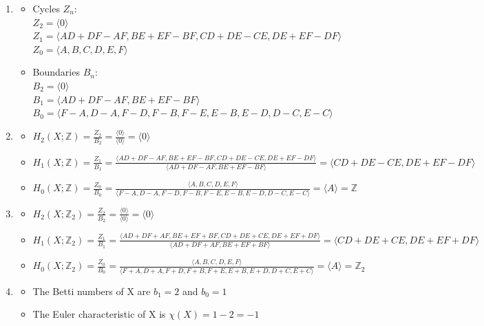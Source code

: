 \documentclass{article}
\begin{document}
\begin{enumerate}[label*=\alph*)]
    \item 
        \begin{itemize}
            \item Cycles $Z_n$: \\
                $Z_2 = \langle 0 \rangle$\\
                $Z_1 = \langle AD + DF - AF, BE + EF - BF, CD + DE - CE, DE + EF - DF \rangle$\\
                $Z_0 = \langle A, B, C, D, E, F \rangle$
            \item Boundaries $B_n$: \\
                $B_2 = \langle 0 \rangle$\\
                $B_1 = \langle AD + DF - AF, BE + EF - BF \rangle$\\
                $B_0 = \langle F - A, D - A, F - D, F - B, F - E, E - B, E - D, D - C, E - C \rangle$
        \end{itemize}
    \item
        \begin{itemize}
            \item $H_2(X;\mathbb{Z})= \frac{Z_2}{B_2} = \frac{\langle 0 \rangle}{\langle 0 \rangle} = \langle 0 \rangle$
            \item $H_1(X;\mathbb{Z}) = \frac{Z_1}{B_1} = 
                \frac{\langle AD + DF - AF, BE + EF - BF, CD + DE - CE, DE + EF - DF \rangle}
                        {\langle AD + DF - AF, BE + EF - BF \rangle} =
                    \langle CD + DE - CE, DE + EF - DF \rangle$
            \item $H_0(X;\mathbb{Z}) = \frac{Z_0}{B_0} = \frac{\langle A, B, C, D, E, F \rangle}{\langle F - A, D - A, F - D, F - B, F - E, E - B, E - D, D - C, E - C \rangle} = \langle A \rangle = \mathbb{Z}$
        \end{itemize}
    \item 
        \begin{itemize}
            \item $H_2(X;\mathbb{Z}_2)= \frac{Z_2}{B_2} = \frac{\langle 0 \rangle}{\langle 0 \rangle} = \langle 0 \rangle$
            \item $H_1(X;\mathbb{Z}_2) = \frac{Z_1}{B_1} = 
                \frac{\langle AD + DF + AF, BE + EF + BF, CD + DE + CE, DE + EF + DF \rangle}
                        {\langle AD + DF + AF, BE + EF + BF \rangle} =
                    \langle CD + DE + CE, DE + EF + DF \rangle$
            \item $H_0(X;\mathbb{Z}_2) = \frac{Z_0}{B_0} = \frac{\langle A, B, C, D, E, F \rangle}{\langle F + A, D + A, F + D, F + B, F + E, E + B, E + D, D + C, E + C \rangle} = \langle A \rangle = \mathbb{Z}_2$
        \end{itemize}
    \item
        \begin{itemize}
            \item The Betti numbers of X are $b_1 = 2$ and $b_0 = 1$
            \item The Euler characteristic of X is $\chi(X) = 1 - 2 = -1$
        \end{itemize}

\end{enumerate} 
\end{document}
